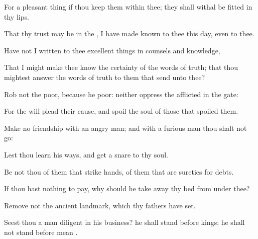 {For
{} a pleasant
thing if thou
keep them
within thee; they shall
withal be
fitted in thy
lips.

That thy
trust may be in the
{}, I have made
known to thee this
day, even to thee.

Have not I
written to
thee excellent
things in
counsels and
knowledge,

That I might make thee
know the
certainty of the
words of
truth; that thou mightest
answer the
words of
truth to them that
send unto thee?


\par }{\PP {}Rob not the
poor, because he
{}
poor: neither
oppress the
afflicted in the
gate:

For the
{} will
plead their
cause, and
spoil the
soul of those that
spoiled them.


\par }{\PP {}Make no
friendship with an
angry
man; and with a
furious
man thou shalt not
go:

Lest thou
learn his
ways, and
get a
snare to thy
soul.


\par }{\PP {}Be not thou
{} of them that
strike
hands,
{} of them that are
sureties for
debts.

If thou hast nothing to
pay, why should he take
away thy
bed from under thee?

Remove not the
ancient
landmark, which thy
fathers have
set.

Seest thou a
man
diligent in his
business? he shall
stand
before
kings; he shall not
stand
before
mean
{}.




\par }
